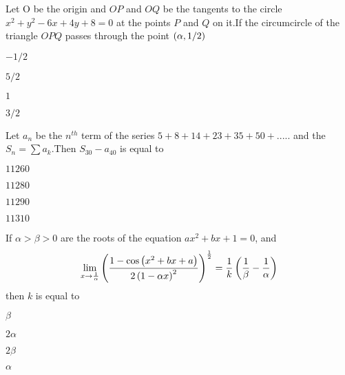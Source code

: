         \item Let O be the origin and $OP$ and $OQ$ be the tangents to the circle $x^2+y^2-6x+4y+8=0$ at the points $P$ and $Q$ on it.If the circumcircle of the triangle $OPQ$ passes through the point $\left(\alpha,1/2\right)$  \hfill{}\\
       \begin{enumerate}    
        \begin{multicols}{4}
                \item $-1/2$
                \item $5/2$
                \item $1$
                \item $3/2$
                \end{multicols}
              \end{enumerate}   
       \item Let $a_n$ be the $n^{th}$ term of the series $5+8+14+23+35+50+.....$ and the $S_n =\sum a_k$.Then $S_{30}-a_{40}$ is equal to
        \hfill{}\\
      \begin{enumerate}    
        \begin{multicols}{4}
                \item $11260$
                \item $11280$
                \item $11290$
                \item $11310$
                \end{multicols}
              \end{enumerate}  
               \item If $\alpha>\beta>0$ are the roots of the equation $ax^2 + bx + 1 = 0$, and 
    \begin{align*}
        \lim_{x \to \frac{1}{\alpha}} \left(\frac{1-\cos{\ensuremath{\left(x^2 + bx + a\right)}}}{2\left(1 - \alpha x\right)^2}\right)^{\frac{1}{2}} = \frac{1}{k}\left(\frac{1}{\beta} - \frac{1}{\alpha}\right)
    \end{align*}
    then $k$ is equal to
        \hfill{}\\
        \begin{enumerate}    
        \begin{multicols}{4}
                \item $\beta$
                \item $2\alpha$
                \item $2\beta$
                \item $\alpha$
                \end{multicols}
              \end{enumerate}     
